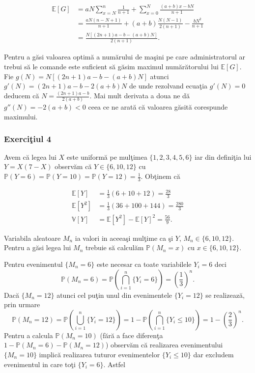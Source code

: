 \documentclass[]{article}
\def\PP{{\mathbb P}}
\def\EE{{\mathbb E}}
\def\VV{{\mathbb V}}
\begin{document}
\begin{align*}
  \EE[G] &= aN\displaystyle\sum_{x=N}^{n}\frac{1}{n+1}+\sum_{x=0}^{N}\frac{(a+b)x-bN}{n+1}\\
  &= \frac{aN(n-N+1)}{n+1}+(a+b)\frac{N(N-1)}{2(n+1)}-\frac{bN^2}{n+1}\\
  &=\frac{N[(2n+1)a-b-(a+b)N]}{2(n+1)}.
\end{align*}

Pentru a g\u asi valoarea optim\u a a num\u arului de ma\c sini pe care
administratorul ar trebui s\u a le comande este suficient s\u a g\u asim
maximul num\u ar\u atorului lui \(\EE[G]\). Fie
\(g(N)=N[(2n+1)a-b-(a+b)N]\) atunci \(g'(N)=(2n+1)a-b-2(a+b)N\) de unde
rezolvand ecua\c tia \(g'(N)=0\) deducem c\u a
\(N=\frac{(2n+1)a-b}{2(a+b)}\). Mai mult derivata a doua ne d\u a
\(g''(N) = -2(a+b)<0\) ceea ce ne arat\u a c\u a valoarea g\u asit\u a
corespunde maximului.

\subsubsection{\texorpdfstring{Exerci\c tiul
4}{Exerciiul 4}}\label{exerciiul-4}

Avem c\u a legea lui \(X\) este uniform\u a pe mul\c timea
\(\{1,2,3,4,5,6\}\) iar din defini\c tia lui \(Y=X(7-X)\) observ\u am
c\u a \(Y\in\{6,10,12\}\) cu
\(\PP(Y=6)=\PP(Y=10)=\PP(Y=12)=\frac{1}{3}\). Ob\c tinem c\u a

\begin{align*}
  \EE[Y] &= \frac{1}{3}(6+10+12)=\frac{28}{3}\\
  \EE[Y^2] &=  \frac{1}{3}(36+100+144)=\frac{280}{3}\\
  \VV[Y] &= \EE[Y^2] - \EE[Y]^2 = \frac{56}{9}.
\end{align*}

Variabila aleatoare \(M_n\) ia valori in aceea\c si mul\c time ca \c si
\(Y\), \(M_n\in\{6,10,12\}\). Pentru a g\u asi legea lui \(M_n\) trebuie
s\u a calcul\u am \(\PP(M_n=x)\) cu \(x\in\{6,10,12\}\).

Pentru evenimentul \(\{M_n=6\}\) este necesar ca toate variabilele
\(Y_i=6\) deci \[
  \PP(M_n=6)=\PP\left(\bigcap_{i=1}^{n}\{Y_i=6\}\right)=\left(\frac{1}{3}\right)^n.
\] Dac\u a \(\{M_n=12\}\) atunci cel pu\c tin unul din evenimentele
\(\{Y_i=12\}\) se realizeaz\u a, prin urmare \[
   \PP(M_n=12)=\PP\left(\bigcup_{i=1}^{n}\{Y_i=12\}\right)=1-\PP\left(\bigcap_{i=1}^{n}\{Y_i\leq 10\}\right)=1-\left(\frac{2}{3}\right)^n.
\] Pentru a calcula \(\PP(M_n=10)\) (f\u ar\u a a face diferen\c ta
\(1-\PP(M_n=6)-\PP(M_n=12)\)) observ\u am c\u a realizarea evenimentului
\(\{M_n=10\}\) implic\u a realizarea tuturor evenimentelor
\(\{Y_i\leq10\}\) dar excludem evenimentul in care to\c ti
\(\{Y_i=6\}\). Astfel
\end{document}
